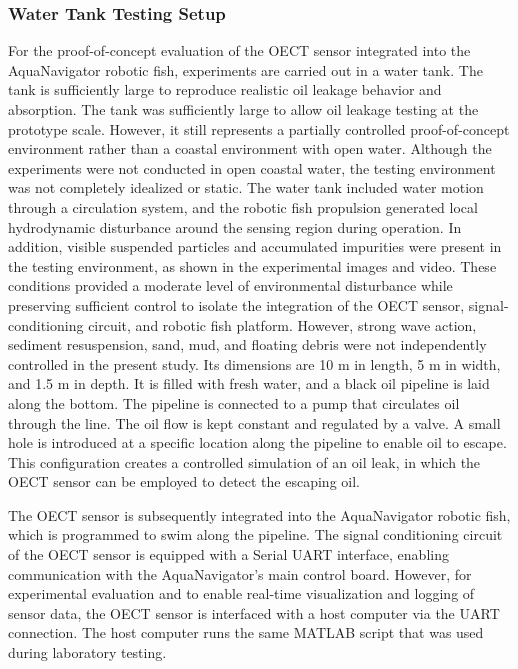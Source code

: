 \documentclass{iopjournal}
\begin{document}
\subsubsection{Water Tank Testing Setup}
For the proof-of-concept evaluation of the OECT sensor integrated into the AquaNavigator robotic fish, experiments are carried out in a water tank. The tank is sufficiently large to reproduce realistic oil leakage behavior and absorption. 
The tank was sufficiently large to allow oil leakage testing at the prototype scale. However, it still represents a partially controlled proof-of-concept environment rather than a coastal environment with open water. Although the experiments were not conducted in open coastal water, the testing environment was not completely idealized or static. The water tank included  water motion through a circulation system, and the robotic fish propulsion generated local hydrodynamic disturbance around the sensing region during operation. In addition, visible suspended particles and accumulated impurities were present in the testing environment, as shown in the experimental images and video. These conditions provided a moderate level of environmental disturbance while preserving sufficient control to isolate the integration of the OECT sensor, signal-conditioning circuit, and robotic fish platform. However, strong wave action, sediment resuspension, sand, mud, and floating debris were not independently controlled in the present study.
Its dimensions are 10 m in length, 5 m in width, and 1.5 m in depth. It is filled with fresh water, and a black oil pipeline is laid along the bottom. The pipeline is connected to a pump that circulates oil through the line. The oil flow is kept constant and regulated by a valve. A small hole is introduced at a specific location along the pipeline to enable oil to escape. This configuration creates a controlled simulation of an oil leak, in which the OECT sensor can be employed to detect the escaping oil.

The OECT sensor is subsequently integrated into the AquaNavigator robotic fish, which is programmed to swim along the pipeline. The signal conditioning circuit of the OECT sensor is equipped with a Serial UART interface, enabling communication with the AquaNavigator’s main control board. However, for experimental evaluation and to enable real-time visualization and logging of sensor data, the OECT sensor is interfaced with a host computer via the UART connection. The host computer runs the same MATLAB script that was used during laboratory testing.
\end{document}
